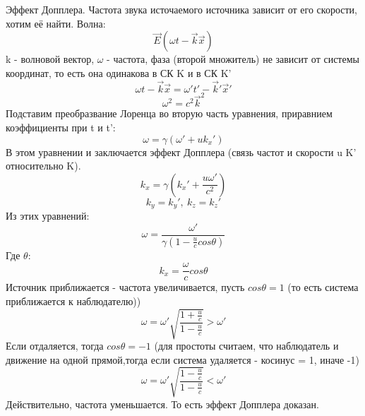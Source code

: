 Эффект Допплера.
Частота звука источаемого источника зависит от его скорости, хотим её найти.
Волна:
\[\Vec{E}(\omega t - \Vec{k}\Vec{x})\]
k - волновой вектор, $\omega$ - частота, фаза (второй множитель) не зависит от системы координат, то есть она одинакова в СК K и в СК K'
\[\omega t - \Vec{k}\Vec{x} = \omega' t' - \Vec{k}'\Vec{x}'\]
\[\omega^2 = c^2 \Vec{k}^2\]
Подставим преобразвание Лоренца во вторую часть уравнения, приравнием коэффициенты при t и t':
\[\omega = \gamma(\omega' + uk_x')\]
В этом уравнении и заключается эффект Допплера (связь частот и скорости u K' относительно K).
\[k_x = \gamma (k_x' + \frac{u\omega'}{c^2})\]
\[k_y = k_y', \ k_z = k_z'\]
Из этих уравнений:
\[\omega = \frac{\omega'}{\gamma(1 - \frac{u}{c}cos\theta)}\]
Где $\theta$:
\[k_x = \frac{\omega}{c}cos\theta\]
Источник приближается - частота увеличивается, пусть $cos \theta = 1$ (то есть система приближается к наблюдателю))
\[\omega = \omega'\sqrt{\frac{1 + \frac{u}{c}}{1 - \frac{u}{c}}} > \omega'\]
Если отдаляется, тогда $cos \theta = -1$ (для простоты считаем, что наблюдатель и движение на одной прямой,тогда если система удаляется - косинус = 1, иначе -1)
\[\omega = \omega'\sqrt{\frac{1 - \frac{u}{c}}{1 - \frac{u}{c}}} < \omega'\]
Действительно, частота уменьшается.
То есть эффект Допплера доказан.